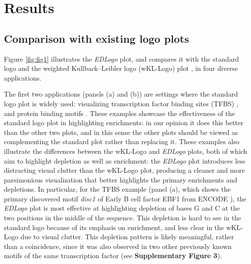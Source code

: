 \documentclass{bmcart}
\begin{document}
\section*{Results}

\subsection*{Comparison with existing logo plots}

Figure \ref{fig:fig1} illustrates the \textit{EDLogo} plot,
and compares it with the standard logo and the weighted Kullback--Leibler logo (wKL-Logo) 
plot \cite{Thomsen2012}, in four diverse applications.

The first two applications (panels (a) and (b)) are settings where the standard logo plot
is widely used: visualizing transcription factor binding sites (TFBS) \cite{Tan2016,Kheradpour2013,Zhao2013,Sandelin2004,Wingender2000,Jolma2013}, and protein binding motifs \cite{Shameer2009, Joseph2014}. 
These examples showcase the effectiveness of the standard logo plot in highlighting enrichments: in
our opinion it does this better than the other two plots, and in this sense the other plots
should be viewed as complementing the standard plot rather than replacing it.
These examples also illustrate the differences between the wKL-Logo and \textit{EDLogo} plots, both of which aim
to highlight depletion as well as enrichment: the \textit{EDLogo} plot introduces less distracting
visual clutter than the wKL-Logo plot, producing a cleaner and more parsimonious visualization
that better highlights the primary enrichments and depletions. In particular,
for the TFBS example (panel (a), which shows the primary discovered motif \textit{disc1} of Early B cell factor EBF1 from ENCODE \cite{Kheradpour2013}), the \textit{EDLogo} plot is most effective at highlighting depletion of bases G and C at the two positions in the middle of the sequence. This depletion is hard to see in the standard logo because of its emphasis on enrichment, and less clear in the wKL-Logo due to visual clutter. This depletion pattern is likely meaningful, rather than a coincidence, since it was also observed in two other previously known motifs of the same transcription factor \cite{Sandelin2004,Jolma2013} (see \textbf{Supplementary Figure 3}). 




\end{document}

